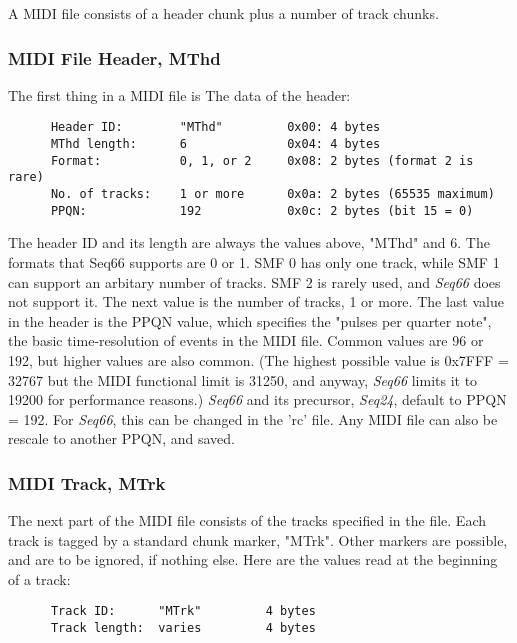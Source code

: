    A MIDI file consists of a header chunk plus a number of track chunks.

\subsubsection{MIDI File Header, MThd}
\label{subsubsec:midi_format_header}

   The first thing in a MIDI file is The data of the header:

   \begin{verbatim}
      Header ID:        "MThd"         0x00: 4 bytes
      MThd length:      6              0x04: 4 bytes
      Format:           0, 1, or 2     0x08: 2 bytes (format 2 is rare)
      No. of tracks:    1 or more      0x0a: 2 bytes (65535 maximum)
      PPQN:             192            0x0c: 2 bytes (bit 15 = 0)
   \end{verbatim}

   The header ID and its length are always the values above, "MThd" and 6.
   The formats that Seq66 supports are 0 or 1.
   SMF 0 has only one track, while SMF 1 can
   support an arbitary number of tracks.
   SMF 2 is rarely used, and \textsl{Seq66} does not support it.
   The next value is the number of tracks, 1 or more.
   The last value in the header is the
   PPQN value, which specifies the "pulses per quarter note", the
   basic time-resolution of events in the MIDI file.  Common values are 96 or
   192, but higher values are also common.
   (The highest possible value is 0x7FFF = 32767 but the MIDI functional limit
   is 31250, and anyway,
   \textsl{Seq66} limits it to 19200 for performance reasons.)
   \textsl{Seq66} and its precursor, \textsl{Seq24}, default to PPQN = 192.
   For \textsl{Seq66}, this can be changed in the 'rc' file.
   Any MIDI file can also be rescale to another PPQN, and saved.

\subsubsection{MIDI Track, MTrk}
\label{subsubsec:midi_format_track}

   The next part of the MIDI file consists of the tracks specified in the file.
   Each track is tagged by
   a standard chunk marker, "MTrk".  Other markers are possible, and are to be
   ignored, if nothing else.  Here are the values read at the beginning of a
   track:

   \begin{verbatim}
      Track ID:      "MTrk"         4 bytes
      Track length:  varies         4 bytes
   \end{verbatim}

